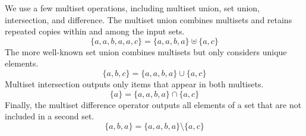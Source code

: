 \documentclass{article}
\begin{document}
We use a few multiset operations, including multiset union, set union, intersection, and difference. The multiset union combines multisets and retains repeated copies within and among the input sets.
\begin{equation}\nonumber
    \{a, a, b, a, a, c\} = \{a, a, b, a\} \uplus \{a, c\}
\end{equation}
The more well-known set union combines multisets but only considers unique elements.
\begin{equation}\nonumber
    \{a, b, c\} = \{a, a, b, a\} \cup \{a, c\}
\end{equation}
Multiset intersection outputs only items that appear in both multisets.
\begin{equation}\nonumber
    \{a\} = \{a, a, b, a\} \cap \{a, c\}
\end{equation}
Finally, the multiset difference operator outputs all elements of a set that are not included in a second set.
\begin{equation}\nonumber
    \{a, b, a\} = \{a, a, b, a\} \setminus \{a, c\}
\end{equation}



\end{document}
